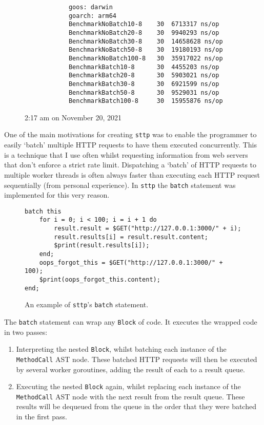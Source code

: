 \begin{figure}[H]
\begin{center}
\begin{verbatim}
            goos: darwin
            goarch: arm64
            BenchmarkNoBatch10-8    30  6713317 ns/op
            BenchmarkNoBatch20-8    30  9940293 ns/op
            BenchmarkNoBatch30-8    30  14658628 ns/op
            BenchmarkNoBatch50-8    30  19180193 ns/op 
            BenchmarkNoBatch100-8   30  35917022 ns/op
            BenchmarkBatch10-8      30  4455203 ns/op
            BenchmarkBatch20-8      30  5903021 ns/op
            BenchmarkBatch30-8      30  6921599 ns/op
            BenchmarkBatch50-8      30  9529031 ns/op
            BenchmarkBatch100-8     30  15955876 ns/op
        \end{verbatim}
        \tiny{2:17 am on November 20, 2021}
    \end{center}
\end{figure}

One of the main motivations for creating \verb|sttp| was to enable the programmer to easily `batch' multiple HTTP requests to have them executed concurrently. This is a technique that I use often whilst requesting information from web servers that don't enforce a strict rate limit. Dispatching a `batch' of HTTP requests to multiple worker threads is often always faster than executing each HTTP request sequentially (from personal experience). In \verb|sttp| the \verb|batch| statement was implemented for this very reason.

\begin{figure}[H]
    \begin{verbatim}
batch this
    for i = 0; i < 100; i = i + 1 do
        result.result = $GET("http://127.0.0.1:3000/" + i);
        result.results[i] = result.result.content;
        $print(result.results[i]);
    end;
    oops_forgot_this = $GET("http://127.0.0.1:3000/" + 100);
    $print(oops_forgot_this.content);
end;
    \end{verbatim}
    \cprotect\caption{An example of \verb|sttp|'s \verb|batch| statement.}
\end{figure}

The \verb|batch| statement can wrap any \verb|Block| of code. It executes the wrapped code in two passes:

\begin{enumerate}
    \item Interpreting the nested \verb|Block|, whilst batching each instance of the \verb|MethodCall| AST node. These batched HTTP requests will then be executed by several worker goroutines, adding the result of each to a result queue.
    \item Executing the nested \verb|Block| again, whilst replacing each instance of the \verb|MethodCall| AST node with the next result from the result queue. These results will be dequeued from the queue in the order that they were batched in the first pass.
\end{enumerate}

